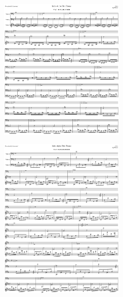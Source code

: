 \begin{figure}[H]                                             
{                                                             
  \setlength{\tabcolsep}{3.0pt}                               
  \setlength\cmidrulewidth{\heavyrulewidth} %
    \begin{subfigure}{0.5\textwidth}                            
  \includegraphics[width=6cm]{music/title_no_23_page_1001.png}%
    \end{subfigure}                                             
  \begin{subfigure}{0.5\textwidth}                            
  \includegraphics[width=6cm]{music/title_no_24_page_1001.png}%
    \end{subfigure}                                             
}                                                             
\end{figure}                                                  


